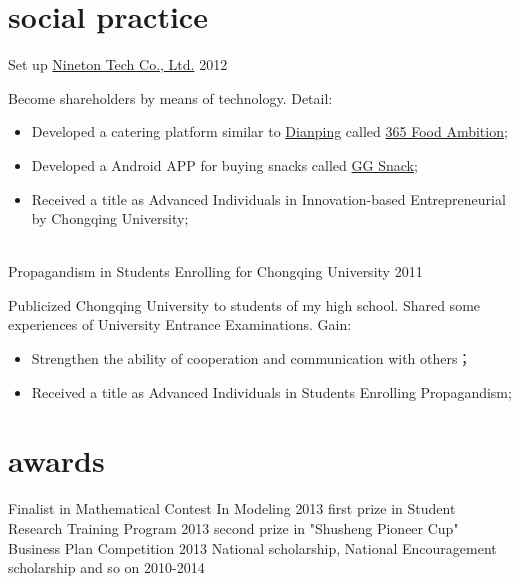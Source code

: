 \documentclass[]{friggeri-cv} %
\begin{document}
\section{social practice}
\begin{entrylist}
\entryact
{Set up \href{http://nineton.cn/}{Nineton Tech Co., Ltd.}}
{2012}
{Become shareholders by means of technology. Detail:
\begin{itemize}
    \item Developed a catering platform similar to \href{https://www.dianping.com/}{Dianping} called \href{http://nineton.cn/product.php?id=17}{365 Food Ambition};
    \item Developed a Android APP for buying snacks called \href{http://apk.gfan.com/Product/App584080.html}{GG Snack};
    \item Received a title as Advanced Individuals in Innovation-based Entrepreneurial by Chongqing University;
\end{itemize}
}
\\
\entryact
{Propagandism in Students Enrolling for Chongqing University}
{2011}
{Publicized Chongqing University to students of my high school. Shared some experiences of University Entrance Examinations. Gain:
\begin{itemize}
    \item Strengthen the ability of cooperation and communication with others；
    \item Received a title as Advanced Individuals in Students Enrolling Propagandism;
\end{itemize}
}
\end{entrylist}

\section{awards}

\begin{entrylist}
\entryac
{Finalist in Mathematical Contest In Modeling}
{2013}
\entryac
{first prize in Student Research Training Program}
{2013}
\entryac
{second prize in "Shusheng Pioneer Cup" Business Plan Competition}
{2013}
\entryac
{National scholarship, National Encouragement scholarship and so on}
{2010-2014}
\end{entrylist}
\end{document}
